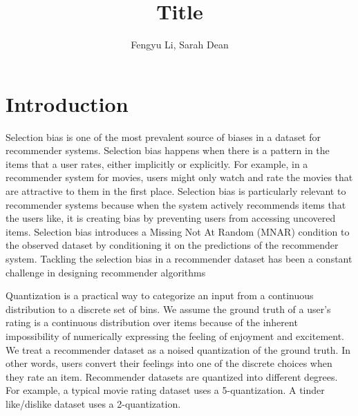 \documentclass[12pt, letterpaper]{article}
\title{\vspace{-2.0cm}Title }
\author{Fengyu Li, Sarah Dean}
\date{}
\theoremstyle{definition}\newtheorem*{definition}{Definition}
\theoremstyle{definition}\newtheorem*{example}{Example}
\theoremstyle{definition}\newtheorem*{remark}{Remark}
\begin{document}
\maketitle

\begin{abstract}

\end{abstract}

\section{Introduction}
Selection bias is one of the most prevalent source of biases in a dataset for recommender systems. Selection bias happens when there is a pattern in the items that a user rates, either implicitly or explicitly. For example, in a recommender system for movies, users might only watch and rate the movies that are attractive to them in the first place. Selection bias is particularly relevant to recommender systems because when the system actively recommends items that the users like, it is creating bias by preventing users from accessing uncovered items. Selection bias introduces a Missing Not At Random (MNAR) condition to the observed dataset by conditioning it on the predictions of the recommender system. Tackling the selection bias in a recommender dataset has been a constant challenge in designing recommender algorithms

Quantization is a practical way to categorize an input from a continuous distribution to a discrete set of bins. We assume the ground truth of a user's rating is a continuous distribution over items because of the inherent impossibility of numerically expressing the feeling of enjoyment and excitement. We treat a recommender dataset as a noised quantization of the ground truth. In other words, users convert their feelings into one of the discrete choices when they rate an item. Recommender datasets are quantized into different degrees. For example, a typical movie rating dataset uses a 5-quantization. A tinder like/dislike dataset uses a 2-quantization.
\end{document}
